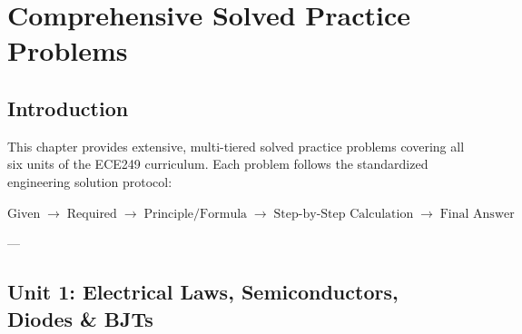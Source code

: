 \chapter{Comprehensive Solved Practice Problems}
\label{chap:practice-problems}

\section{Introduction}
This chapter provides extensive, multi-tiered solved practice problems covering all six units of the ECE249 curriculum. Each problem follows the standardized engineering solution protocol:
\begin{center}
    \small\bfseries\color{brandnavy}
    $\text{Given} \;\longrightarrow\; \text{Required} \;\longrightarrow\; \text{Principle/Formula} \;\longrightarrow\; \text{Step-by-Step Calculation} \;\longrightarrow\; \text{Final Answer}$
\end{center}

---

\section{Unit 1: Electrical Laws, Semiconductors, Diodes \& BJTs}

